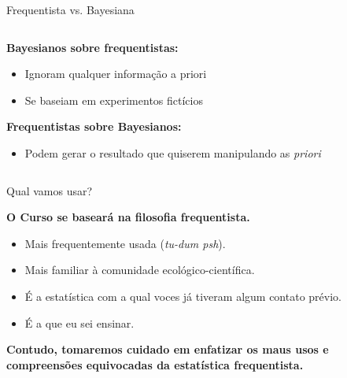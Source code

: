 \documentclass{beamer}\usepackage[]{graphicx}\usepackage[]{color}
\begin{document}
\begin{frame}{Frequentista vs. Bayesiana}

\begin{columns}[lr]


\begin{scriptsize}
\textbf{Bayesianos sobre frequentistas:
}
\begin{itemize}

  \item{Ignoram qualquer informação a priori}
  
  \item{Se baseiam em experimentos fictícios}
  
\end{itemize}

\vspace{.5in}

\textbf{Frequentistas sobre Bayesianos:}

\begin{itemize}

  \item{Podem gerar o resultado que quiserem manipulando as \emph{priori}}
  
\end{itemize}

\end{scriptsize}


\end{columns}


\end{frame}


\begin{frame}{Qual vamos usar?}

\textbf{O Curso se baseará na filosofia frequentista.}

\begin{itemize}

\item Mais frequentemente usada (\emph{tu-dum psh}).

\item Mais familiar à comunidade ecológico-científica.

\item É a estatística com a qual voces já tiveram algum contato prévio.

\item É a que eu sei ensinar.

\end{itemize}

\textbf{Contudo, tomaremos cuidado em enfatizar os maus usos e compreensões equivocadas da estatística frequentista.}
  
  
\end{frame}


\end{document}
